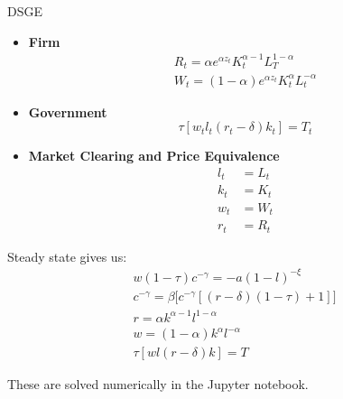 \documentclass[12pt]{article}
\newenvironment{problem}[2][Problem]{\begin{trivlist}
\item[\hskip \labelsep {\bfseries #1}\hskip \labelsep {\bfseries #2.}]}{\end{trivlist}}
\theoremstyle{definition}
\theoremstyle{definition}
\theoremstyle{definition}
\theoremstyle{definition}
\begin{document}
\begin{section}{DSGE}
\begin{problem}{6}
\begin{itemize}
\item \textbf{Firm}
\begin{align}
R_t = \alpha e^{\alpha z_t} K_t^{\alpha - 1} L_T^{1-\alpha} \\
W_t = (1 - \alpha) e^{\alpha z_t} K_t^\alpha L_t^{- \alpha}
\end{align}
\item \textbf{Government}
\begin{equation}
\tau[w_tl_t(r_t - \delta)k_t] = T_t
\end{equation}
\item \textbf{Market Clearing and Price Equivalence}
\begin{align}
l_t &= L_t \\
k_t &= K_t \\
w_t &= W_t \\
r_t &= R_t 
\end{align}
\end{itemize}
Steady state gives us:
\begin{align}
w(1 - \tau)c^{-\gamma} = - a (1 - l)^{-\xi} \\
c^{-\gamma} = \beta \big[c^{-\gamma} [(r - \delta)(1 - \tau) + 1]\big] \\
r = \alpha k^{\alpha - 1}l^{1-\alpha} \\
w = (1 - \alpha) k^\alpha l^{-\alpha} \\
\tau[wl(r - \delta)k] = T
\end{align}
\end{problem}
These are solved numerically in the Jupyter notebook.

\end{section}
\end{document}
